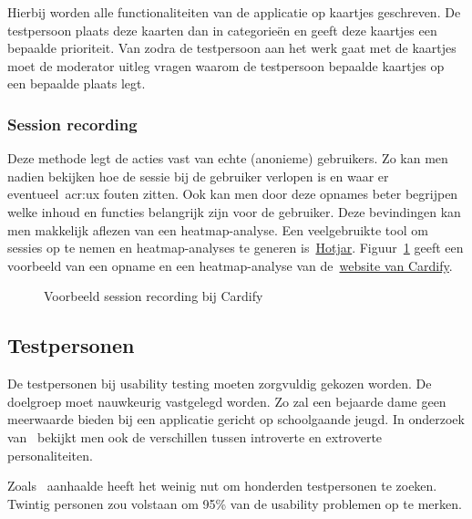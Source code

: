 Hierbij worden alle functionaliteiten van de applicatie op kaartjes geschreven. De testpersoon plaats deze kaarten dan in categorieën en geeft deze kaartjes een bepaalde prioriteit. Van zodra de testpersoon aan het werk gaat met de kaartjes moet de moderator uitleg vragen waarom de testpersoon bepaalde kaartjes op een bepaalde plaats legt. 

\subsubsection{Session recording}
\label{sec:usability-testing:testmethoden:session-recording}

Deze methode legt de acties vast van echte (anonieme) gebruikers. Zo kan men nadien bekijken hoe de sessie bij de gebruiker verlopen is en waar er eventueel~\acrlong{acr:ux} fouten zitten. Ook kan men door deze opnames beter begrijpen welke inhoud en functies belangrijk zijn voor de gebruiker. Deze bevindingen kan men makkelijk aflezen van een heatmap-analyse. Een veelgebruikte tool om sessies op te nemen en heatmap-analyses te generen is~\href{https://www.hotjar.com/}{Hotjar}. Figuur~\ref{fig:testing-hotjar} geeft een voorbeeld van een opname en een heatmap-analyse van de~\href{https://getcardify.com/}{website van Cardify}.

\begin{figure}
    \centering
    \qquad
    \caption[Voorbeeld session recording]{Voorbeeld session recording bij Cardify}
    \label{fig:testing-hotjar}
\end{figure}

\subsection{Testpersonen}
\label{sec:usability-testing:testpersonen}

De testpersonen bij usability testing moeten zorgvuldig gekozen worden. De doelgroep moet nauwkeurig vastgelegd worden. Zo zal een bejaarde dame geen meerwaarde bieden bij een applicatie gericht op schoolgaande jeugd. In onderzoek van~\textcite{Alnashri2016} bekijkt men ook de verschillen tussen introverte en extroverte personaliteiten.

Zoals~\textcite{Faulkner2003} aanhaalde heeft het weinig nut om honderden testpersonen te zoeken. Twintig personen zou volstaan om 95\% van de usability problemen op te merken.

